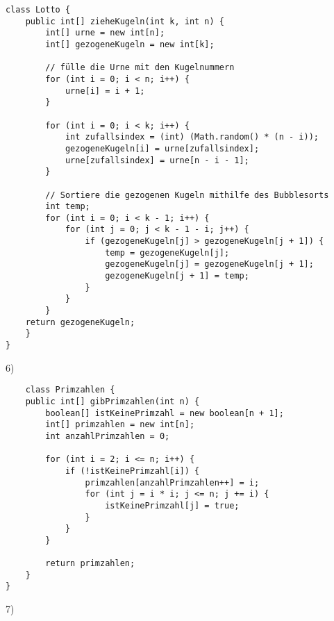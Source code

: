 \documentclass[fontsize=12pt]{article}
\begin{document}
\begin{verbatim}
class Lotto {
    public int[] zieheKugeln(int k, int n) {
        int[] urne = new int[n];
        int[] gezogeneKugeln = new int[k];
        
        // fülle die Urne mit den Kugelnummern
        for (int i = 0; i < n; i++) {
            urne[i] = i + 1;
        }

        for (int i = 0; i < k; i++) {
            int zufallsindex = (int) (Math.random() * (n - i));
            gezogeneKugeln[i] = urne[zufallsindex];
            urne[zufallsindex] = urne[n - i - 1];
        }
        
        // Sortiere die gezogenen Kugeln mithilfe des Bubblesorts
        int temp;
        for (int i = 0; i < k - 1; i++) {
            for (int j = 0; j < k - 1 - i; j++) {
                if (gezogeneKugeln[j] > gezogeneKugeln[j + 1]) {
                    temp = gezogeneKugeln[j];
                    gezogeneKugeln[j] = gezogeneKugeln[j + 1];
                    gezogeneKugeln[j + 1] = temp;
                }
            }
        }
    return gezogeneKugeln;
    }
}
\end{verbatim}
6)
\begin{verbatim}
    class Primzahlen {
    public int[] gibPrimzahlen(int n) {
        boolean[] istKeinePrimzahl = new boolean[n + 1];
        int[] primzahlen = new int[n];
        int anzahlPrimzahlen = 0;

        for (int i = 2; i <= n; i++) {
            if (!istKeinePrimzahl[i]) {
                primzahlen[anzahlPrimzahlen++] = i;
                for (int j = i * i; j <= n; j += i) {
                    istKeinePrimzahl[j] = true;
                }
            }
        }

        return primzahlen;
    }
}

\end{verbatim}
7)
\end{document}
